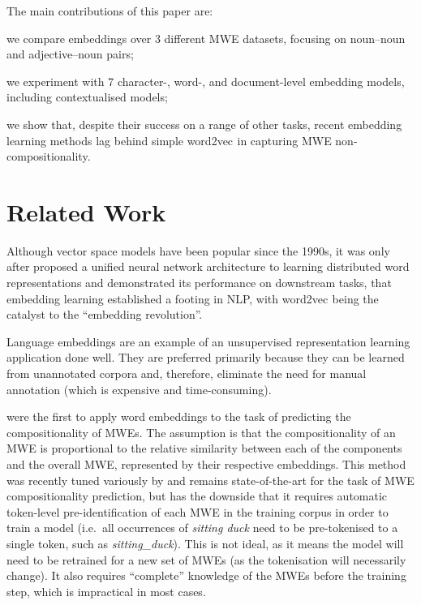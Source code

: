 \documentclass[11pt,a4paper]{article}
\newcommand{\lex}[1]{\textit{#1}\xspace}
\newcommand{\embmethod}[2][]{\textsf{#2}$_{\text{#1}}$\xspace}
\newcommand{\wordtovec}{\embmethod{word2vec}}
\begin{document}
The main contributions of this paper are:
\begin{compactenum}[(i)]
\item we compare embeddings over 3 different MWE datasets, focusing on noun--noun and adjective--noun pairs;
\item we experiment with 7 character-, word-, and document-level embedding models, including contextualised models;
\item we show that, despite their success on a range of other tasks, recent embedding learning methods lag behind simple \wordtovec in capturing MWE non-compositionality.
\end{compactenum}

\section{Related Work}
Although vector space models have been popular since the 1990s, it was only after \citet{Coll2018} proposed a unified neural network architecture to learning distributed word representations and demonstrated its performance on downstream tasks, that embedding learning established a footing in NLP, with \wordtovec \cite{Mikolov2013} being the catalyst to the ``embedding revolution''.

Language embeddings are an example of an unsupervised representation
learning application done well. They are preferred primarily because
they can be learned from unannotated corpora and, therefore, eliminate
the need for manual annotation (which is expensive and time-consuming).

\citet{Salehi2015} were the first to apply word embeddings to the task
of predicting the compositionality of MWEs. The assumption is that the
compositionality of an MWE is proportional to the relative similarity
between each of the components and the overall MWE, represented by their
respective embeddings. This method was recently tuned variously by
\citet{Cordeiro+:2019} and remains state-of-the-art for the task of MWE
compositionality prediction, but has the downside that it requires
automatic token-level pre-identification of each MWE in the training
corpus in order to train a model (i.e.\ all occurrences of \lex{sitting
  duck} need to be pre-tokenised to a single token, such as
\lex{sitting\_duck}). This is not ideal, as it means the model will need
to be retrained for a new set of MWEs (as the tokenisation will
necessarily change). It also requires ``complete'' knowledge of the MWEs
before the training step, which is impractical in most cases.
\end{document}
